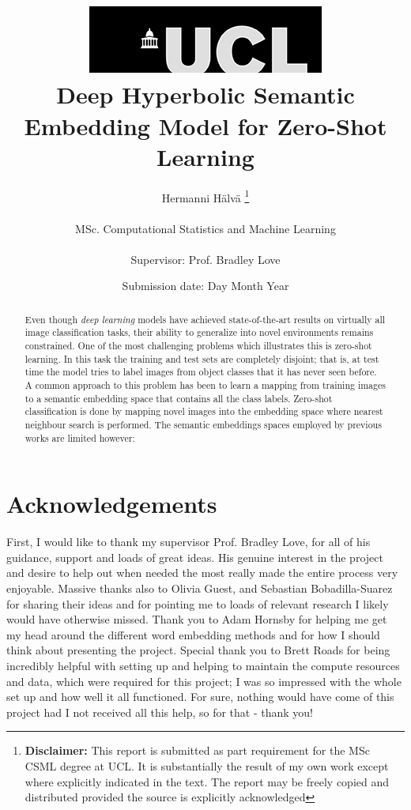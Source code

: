 \documentclass[12pt]{report}
\title{  	{ \includegraphics[scale=.5]{ucl_logo.png}}\\
{{\Huge Deep Hyperbolic Semantic Embedding Model for Zero-Shot Learning}}\\
		}
\date{Submission date: Day Month Year}
\author{Hermanni H{\"a}lv{\"a} \thanks{
{\bf Disclaimer:}
This report is submitted as part requirement for the MSc CSML degree at UCL. It is
substantially the result of my own work except where explicitly indicated in the text.
The report may be freely copied and distributed provided the source is explicitly acknowledged
\newline  %
}
\\ \\
MSc. Computational Statistics and Machine Learning\\ \\
Supervisor: Prof. Bradley Love}
\begin{document}
 
\onehalfspacing
\maketitle

\begin{abstract}
Even though \textit{deep learning} models have achieved state-of-the-art results on virtually all image classification tasks, their ability to generalize into novel environments remains constrained. One of the most challenging problems which illustrates this is zero-shot learning. In this task the training and test sets are completely disjoint; that is, at test time the model tries to label images from object classes that it has never seen before. A common approach to this problem has been to learn a mapping from training images to a semantic embedding space that contains all the class labels. Zero-shot classification is done by mapping novel images into the embedding space where nearest neighbour search is performed. The semantic embeddings spaces employed by previous works are limited however: 







\end{abstract}

\chapter*{Acknowledgements}
\thispagestyle{empty}
First, I would like to thank my supervisor Prof. Bradley Love, for all of his guidance, support and loads of great ideas. His genuine interest in the project and desire to help out when needed the most really made the entire process very enjoyable. Massive thanks also to Olivia Guest, and Sebastian Bobadilla-Suarez for sharing their ideas and for pointing me to loads of relevant research I likely would have otherwise missed. Thank you to Adam Hornsby for helping me get my head around the different word embedding methods and for how I should think about presenting the project. Special thank you to Brett Roads for being incredibly helpful with setting up and helping to maintain the compute resources and data, which were required for this project; I was so impressed with the whole set up and how well it all functioned. For sure, nothing would have come of this project had I not received all this help, so for that - thank you!

\clearpage

\tableofcontents
\listoffigures
\listoftables
\setcounter{page}{1}
\end{document}
